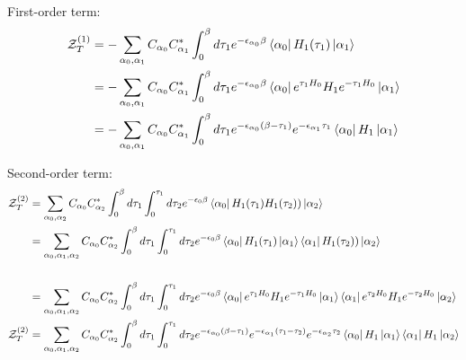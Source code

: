 \documentclass[12pt, two sided]{article}
\begin{document}
First-order term:
\begin{equation}
\begin{aligned}
\mathcal{Z}_T^{(1)} &= -\sum_{\alpha_0, \alpha_1} C_{\alpha_0} C_{\alpha_1}^{*}  \int_{0}^{\beta} d\tau_1 e^{-\epsilon_{\alpha_0} \beta} \bra{\alpha_0}  H_1(\tau_1) \ket{\alpha_1} \\
&= -\sum_{\alpha_0, \alpha_1} C_{\alpha_0} C_{\alpha_1}^{*}  \int_{0}^{\beta} d\tau_1 e^{-\epsilon_{\alpha_0} \beta} \bra{\alpha_0} e^{\tau_1 H_0}H_1e^{-\tau_1 H_0}  \ket{\alpha_1} \\
&= -\sum_{\alpha_0, \alpha_1} C_{\alpha_0} C_{\alpha_1}^{*}  \int_{0}^{\beta} d\tau_1 e^{-\epsilon_{\alpha_0}(\beta-\tau_1)} e^{-\epsilon_{\alpha_1} \tau_1}  \bra{\alpha_0} H_1 \ket{\alpha_1}
\end{aligned}
\end{equation}


Second-order term:
\begin{equation}
\begin{aligned}
\mathcal{Z}_T^{(2)} &=  \sum_{\alpha_0, \alpha_2} C_{\alpha_0} C_{\alpha_2}^{*} \int_0^{\beta} d\tau_1 \int_{0}^{\tau_1} d\tau_2 e^{-\epsilon_{0} \beta} \bra{\alpha_0}  H_1(\tau_1) H_1(\tau_2) ) \ket{\alpha_2} \\
&= \sum_{\alpha_0, \alpha_1, \alpha_2} C_{\alpha_0} C_{\alpha_2}^{*} \int_0^{\beta} d\tau_1 \int_{0}^{\tau_1} d\tau_2 e^{-\epsilon_{0} \beta} \bra{\alpha_0}  H_1(\tau_1) \ket{\alpha_1} \bra{\alpha_1}   H_1(\tau_2) )  \ket{\alpha_2} \\
\\
&= \sum_{\alpha_0, \alpha_1, \alpha_2} C_{\alpha_0} C_{\alpha_2}^{*} \int_0^{\beta} d\tau_1 \int_{0}^{\tau_1} d\tau_2 e^{-\epsilon_{0} \beta} \bra{\alpha_0}  e^{\tau_1 H_0}H_1e^{-\tau_1 H_0}  \ket{\alpha_1} \bra{\alpha_1} e^{\tau_2 H_0}H_1e^{-\tau_2 H_0}  \ket{\alpha_2} \\
\mathcal{Z}_T^{(2)} &= \sum_{\alpha_0, \alpha_1, \alpha_2} C_{\alpha_0} C_{\alpha_2}^{*} \int_0^{\beta} d\tau_1 \int_{0}^{\tau_1} d\tau_2 e^{-\epsilon_{\alpha_0}(\beta-\tau_1)} e^{-\epsilon_{\alpha_1}(\tau_1-\tau_2)} e^{-\epsilon_{\alpha_2} \tau_2} \bra{\alpha_0} H_1 \ket{\alpha_1} \bra{\alpha_1} H_1 \ket{\alpha_2}
\end{aligned}
\end{equation}
\end{document}
